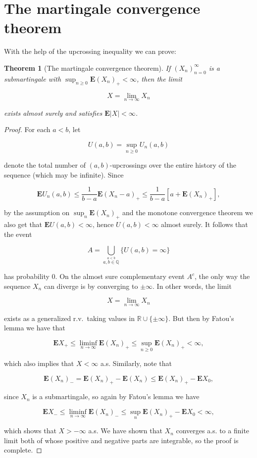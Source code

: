 \documentclass[11pt]{report}
\newcommand{\R}{\mathbb{R}}
\theoremstyle{plain}
\newtheorem{thm}{Theorem}[chapter]
\theoremstyle{definition}
\begin{document}
\section{The martingale convergence theorem}
With the help of the upcrossing inequality we can prove:

\begin{thm}[The martingale convergence theorem]
If $(X_n)_{n=0}^\infty$ is a submartingale with $\sup_{n\ge 0}\mathbf{E} (X_n)_+ < \infty$, then the limit

\[
X = \lim_{n\to\infty} X_n
\]

exists almost surely and satisfies $\mathbf{E}|X|<\infty$.
\end{thm}

\begin{proof}
For each $a<b$, let

\[
U(a,b) = \sup_{n\ge0} U_n(a,b)
\]

denote the total number of $(a,b)$-upcrossings over the entire history of the sequence (which may be infinite). Since

\[
\mathbf{E} U_n(a,b) \le \frac{1}{b-a} \mathbf{E}(X_n-a)_+ \le \frac{1}{b-a} \left[ a + \mathbf{E} (X_n)_+ \right],
\]

by the assumption on $\sup_n \mathbf{E}(X_n)_+$ and the monotone convergence theorem we also get that $\mathbf{E} U(a,b) < \infty$, hence $U(a,b)<\infty$ almost surely. It follows that the event

\[
A = \bigcup_{\stackrel{a<b}{a,b\in\mathbb{Q}}} \{ U(a,b) = \infty \}
\]

has probability $0$. On the almost sure complementary event $A^c$, the only way the sequence $X_n$ can diverge is by converging to $\pm \infty$. In other words, the limit

\[
X = \lim_{n\to\infty} X_n
\]

exists as a generalized r.v.\ taking values in $\R\cup\{\pm\infty\}$. But then by Fatou's lemma we have that

\[
\mathbf{E} X_+ \le \liminf_{n\to\infty} \mathbf{E} (X_n)_+ \le \sup_{n\ge 0} \mathbf{E}(X_n)_+ < \infty,
\]

which also implies that $X<\infty$ a.s. Similarly, note that

\[
\mathbf{E} (X_n)_- = \mathbf{E} (X_n)_+ - \mathbf{E}(X_n) \le \mathbf{E} (X_n)_+ - \mathbf{E} X_0,
\]

since $X_n$ is a submartingale, so again by Fatou's lemma we have

\[
\mathbf{E} X_- \le \liminf_{n\to\infty} \mathbf{E} (X_n)_- \le \sup_n \mathbf{E}(X_n)_+ - \mathbf{E} X_0 < \infty,
\]

which shows that $X>-\infty$ a.s. We have shown that $X_n$ converges a.s. to a finite limit both of whose positive and negative parts are integrable, so the proof is complete.
\end{proof}
\end{document}
